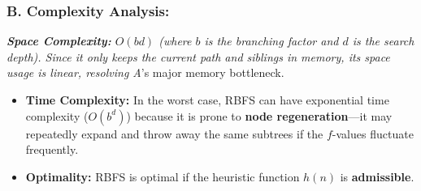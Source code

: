 \subsubsection{B. Complexity Analysis:}
\textit{   \textbf{Space Complexity:} \textbf{$O(bd)$} (where $b$ is the branching factor and $d$ is the search depth). Since it only keeps the current path and siblings in memory, its space usage is linear, resolving A}'s major memory bottleneck.
\begin{itemize}
  \item   \textbf{Time Complexity:} In the worst case, RBFS can have exponential time complexity ($O(b^d)$) because it is prone to \textbf{node regeneration}—it may repeatedly expand and throw away the same subtrees if the $f$-values fluctuate frequently.
  \item   \textbf{Optimality:} RBFS is optimal if the heuristic function $h(n)$ is \textbf{admissible}.
\end{itemize}

